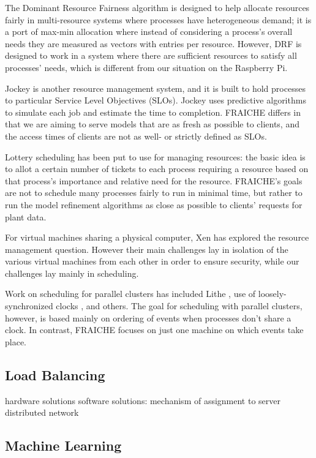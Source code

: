 \documentclass[a4paper]{acm_proc_article-sp}
\begin{document}
The Dominant Resource Fairness algorithm \cite{} is designed to help allocate resources fairly in multi-resource systems where processes have heterogeneous demand; it is a port of max-min allocation \cite{} where instead of considering a process's overall needs they are measured as vectors with entries per resource.  However, DRF is designed to work in a system where there are sufficient resources to satisfy all processes' needs, which is different from our situation on the Raspberry Pi.

Jockey \cite{} is another resource management system, and it is built to hold processes to particular Service Level Objectives (SLOs).  Jockey uses predictive algorithms to simulate each job and estimate the time to completion.  FRAICHE differs in that we are aiming to serve models that are as fresh as possible to clients, and the access times of clients are not as well- or strictly defined as SLOs.

Lottery scheduling has been put to use for managing resources: the basic idea is to allot a certain number of tickets to each process requiring a resource based on that process's importance and relative need for the resource.  FRAICHE's goals are not to schedule many processes fairly to run in minimal time, but rather to run the model refinement algorithms as close as possible to clients' requests for plant data.

For virtual machines sharing a physical computer, Xen has explored the resource management question.  However their main challenges lay in isolation of the various virtual machines from each other in order to ensure security, while our challenges lay mainly in scheduling.

Work on scheduling for parallel clusters has included Lithe \cite{}, use of loosely-synchronized clocks \cite{}, and others.  The goal for scheduling with parallel clusters, however, is based mainly on ordering of events when processes don't share a clock.  In contrast, FRAICHE focuses on just one machine on which events take place.

\subsection{Load Balancing}

hardware solutions
software solutions: mechanism of assignment to server
distributed network


\subsection{Machine Learning}
\end{document}
